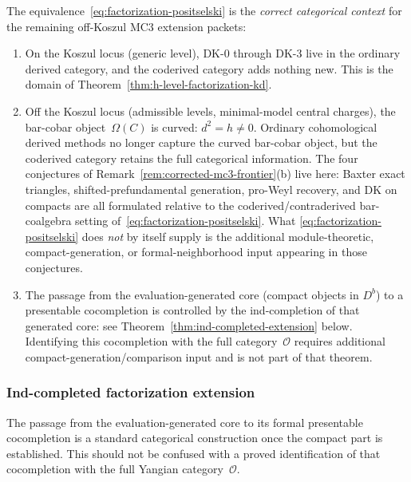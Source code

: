 \begin{remark}
\label{rem:coderived-natural-ambient}
The equivalence~\eqref{eq:factorization-positselski} is the
\emph{correct categorical context} for the remaining off-Koszul MC3
extension packets:
\begin{enumerate}[label=\textup{(\alph*)}]
\item On the Koszul locus (generic level), DK-0 through DK-3
 live in the ordinary derived category, and the coderived
 category adds nothing new. This is the domain of
 Theorem~\ref{thm:h-level-factorization-kd}.
\item Off the Koszul locus (admissible levels, minimal-model central
 charges), the bar-cobar object~$\Omega(C)$ is curved:
 $d^2 = h \neq 0$. Ordinary cohomological derived methods no
 longer capture the curved bar-cobar object, but the coderived
 category retains the full categorical information.
 The four conjectures of
 Remark~\ref{rem:corrected-mc3-frontier}(b)
 live here: Baxter exact triangles, shifted-prefundamental
 generation, pro-Weyl recovery, and DK on compacts are all
 formulated relative to the
 coderived/contraderived bar-coalgebra setting
 of~\eqref{eq:factorization-positselski}. What
 \eqref{eq:factorization-positselski} does \emph{not} by itself
 supply is the additional module-theoretic, compact-generation,
 or formal-neighborhood input appearing in those conjectures.
\item The passage from the evaluation-generated core (compact objects
 in $D^b$) to a presentable cocompletion is controlled by the
 ind-completion of that generated core: see
 Theorem~\ref{thm:ind-completed-extension} below. Identifying this
 cocompletion with the full category~$\mathcal{O}$ requires
 additional compact-generation/comparison input and is not part of
 that theorem.
\end{enumerate}
\end{remark}

\subsubsection*{Ind-completed factorization extension}

The passage from the evaluation-generated core to its formal
presentable cocompletion is a standard categorical construction once
the compact part is established. This should not be confused with a
proved identification of that cocompletion with the full Yangian
category~$\mathcal{O}$.

